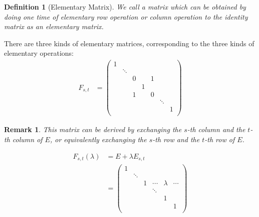 \documentclass[onecolumn]{ctexart}
\newtheorem{definition}{Definition}
\newtheorem{remark}{Remark}
\begin{document}
\begin{definition}[Elementary Matrix]
  We call a matrix which can be obtained by doing one time of elementary row 
  operation or column operation to the identity matrix as an elementary matrix.
\end{definition}

There are three kinds of elementary matrices, corresponding to the three kinds 
of elementary operations:
\begin{equation}
  \begin{split}
    F_{s,t} &= 
    \begin{pmatrix}
      1 \\
        & \ddots & \\
        &        & 0 &   & 1 \\
        &        &   & 1 &   \\
        &        & 1 &   & 0 \\
        &        &   &   &   & \ddots &   \\
        &        &   &   &   &        & 1 \\
    \end{pmatrix}
  \end{split}
\end{equation}
\begin{remark}
  This matrix can be derived by exchanging the $s$-th column and the $t$-th 
  column of $E$, or equivalently exchanging the $s$-th row and the $t$-th row of 
  $E$.
\end{remark}
\begin{equation}
  \begin{split}
    F_{s,t}(\lambda) &= E + \lambda E_{s,t} \\
                     &= 
                     \begin{pmatrix}
                      1 \\
                        & \ddots \\
                        &        & 1 & \cdots & \lambda & \cdots \\
                        &        &   & \ddots &         &        \\
                        &        &   &        & 1       &        \\
                        &        &   &        &         & 1      \\
                     \end{pmatrix}
  \end{split}
\end{equation}
\end{document}
